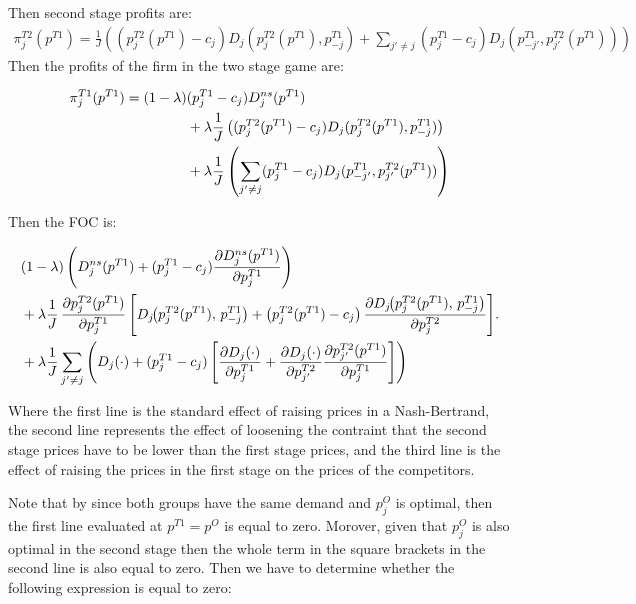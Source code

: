 \documentclass[12pt]{article}
\begin{document}
Then second stage profits are: 
\begin{align}
  \pi_j^{T2}(p^{T1}) =  \frac{1}{J} \left( (p_j^{T2}(p^{T1}) - c_j) D_j(p_j^{T2}(p^{T1}), p_{-j}^{T1})    + \sum_{j'\neq j}  (p_j^{T1} - c_j) D_j(p_{-j'}^{T1}, p_{ j'}^{T2}(p^{T1}))  \right)
\end{align}
Then the profits of the firm in the two stage game are:



\begin{align}\label{eq:4}
    \pi_j^{T1}(p^{T1}) = (1-\lambda) & (p_j^{T1} - c_j) D_j^{ns}(p^{T1}) \notag \\
    & + \lambda \frac{1}{J} \left( (p_j^{T2}(p^{T1}) - c_j) D_j(p_j^{T2}(p^{T1}), p_{-j}^{T1}) \right) \notag \\ 
    & + \lambda \frac{1}{J} \left(  \sum_{j'\neq j}  (p_j^{T1} - c_j) D_j(p_{-j'}^{T1}, p_{ j'}^{T2}(p^{T1}))  \right)
\end{align}

Then the FOC is: 

\begin{align}
    &(1-\lambda) \left( D_j^{ns}(p^{T1}) + (p_j^{T1} - c_j) \frac{\partial D_j^{ns}(p^{T1})}{\partial p_j^{T1}} \right) \notag  \\ 
    & + \lambda \frac{1}{J}\,\frac{\partial p_j^{T2}(p^{T1})}{\partial p_j^{T1}}\,
    \Bigg[ D_j\!\big(p_j^{T2}(p^{T1}),\, p_{-j}^{T1}\big)
    + \big(p_j^{T2}(p^{T1}) - c_j\big)\,
    \frac{\partial D_j\!\big(p_j^{T2}(p^{T1}),\, p_{-j}^{T1}\big)}{\partial p_j^{T2}} \Bigg]. \notag \\
    & + \lambda \frac{1}{J} \sum_{j'\neq j} \left(D_j(\cdot) + (p_j^{T1} - c_j) \left[ \frac{\partial D_j(\cdot)}{\partial p_j^{T1}} + \frac{\partial D_j(\cdot)}{\partial p_{j'}^{T2}} \frac{\partial p_{j'}^{T2}(p^{T1})}{\partial p_j^{T1}}\right]\right)  
\end{align}

Where the first line is the standard effect of raising prices in a Nash-Bertrand, the second line represents the effect of loosening the contraint that the second stage prices have to be lower than the first stage prices, and the third line is the effect of raising the prices in the first stage on the prices of the competitors. 

Note that by since both groups have the same demand and $p_j^O$ is optimal, then the first line evaluated at $p^{T1} = p^O$ is equal to zero. 
Morover, given that $p_j^O$  is also optimal in the second stage then the whole term in the square brackets in the second line is also equal to zero. Then we have to determine whether the following expression is equal to zero: 
\end{document}
